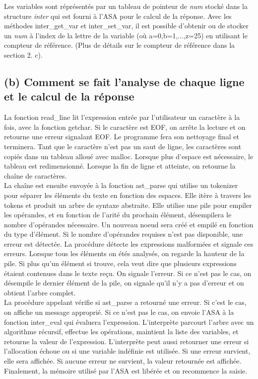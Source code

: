 \documentclass[a4paper,12pt]{article}
\begin{document}
		Les variables sont réprésentés par un tableau de pointeur de \textit{num} stocké dans la structure \textit{inter} qui est fourni à l'ASA pour le calcul de la réponse. Avec les méthodes inter\_get\_var et inter\_set\_var, il est possible d'obtenir ou de stocker un \textit{num} à l'index de la lettre de la variable (où a=0,b=1,...,z=25)  en utilisant le compteur de référence. (Plus de détails sur le compteur de référence dans la section 2. c).

	\subsection{(b) Comment se fait l’analyse de chaque ligne et le calcul de la réponse}
		La fonction read\_line lit l'expression entrée par l'utilisateur un caractère à la fois,
		avec la fonction getchar. Si le caractère est EOF, on arrête la lecture et on retourne
		une erreur signalant EOF. Le programme fera son nettoyage final et terminera. Tant que
		le caractère n'est pas un saut de ligne, les caractères sont copiés dans un tableau
		alloué avec malloc. Lorsque plus d'espace est nécessaire, le tableau est redimensionné.
		Lorsque la fin de ligne et atteinte, on retourne la chaîne de caractères.\\

		La chaîne est ensuite envoyée à la fonction ast\_parse qui utilise un tokenizer pour séparer
		les éléments du texte en fonction des espaces. Elle itère à travers les tokens et produit un
		arbre de syntaxe abstraite. Elle utilise une pile pour empiler les opérandes, et en fonction
		de l'arité du prochain élément, désempilera le nombre d'opérandes nécessaire. Un nouveau
		noeud sera créé et empilé en fonction du type d'élément. Si le nombre d'opérandes requises
		n'est pas disponible, une erreur est détectée. La procédure détecte les expressions malformées
		et signale ces erreurs. Lorsque tous les éléments on étés analysés, on regarde la hauteur de
		la pile. Si plus qu'un élément si trouve, cela veut dire que plusieurs expressions étaient
		contenues dans le texte reçu. On signale l'erreur. Si ce n'est pas le cas, on désempile le dernier
		élément de la pile, on signale qu'il n'y a pas d'erreur et on obtient l'arbre complet.\\

		La procédure appelant vérifie si ast\_parse a retourné une erreur. Si c'est le cas, on affiche
		un message approprié. Si ce n'est pas le cas, on envoie l'ASA à la fonction inter\_eval qui évaluera
		l'expression. L'interprète parcourt l'arbre avec un algorithme récursif, effectue les opérations,
		maintient la liste des variables, et retourne la valeur de l'expression. L'interprète peut aussi
		retourner une erreur si l'allocation échoue ou si une variable indéfinie est utilisée. Si une erreur
		survient, elle sera affichée. Si aucune erreur ne survient, la valeur retournée est affichée.
		Finalement, la mémoire utilisé par l'ASA est libérée et on recommence la saisie.\\
\end{document}
